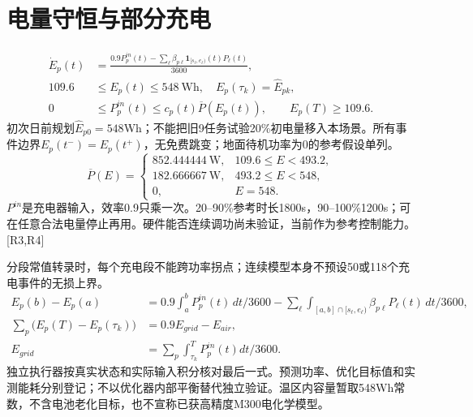 \section{电量守恒与部分充电}
\begin{align}
 \dot E_p(t)&=\frac{0.9P_p^{in}(t)-\sum_\ell\beta_{p\ell}
                   \mathbf1_{[s_\ell,e_\ell)}(t)P_\ell(t)}{3600},\\
 109.6&\le E_p(t)\le548\ \mathrm{Wh},\quad E_p(\tau_k)=\widehat E_{pk},\\
 0&\le P_p^{in}(t)\le c_p(t)\overline P(E_p(t)),\qquad E_p(T)\ge109.6.
 \label{eng:eq:battery}
\end{align}
\noindent 初次日前规划$\widehat E_{p0}=548$Wh；不能把旧9任务试验20\%初电量移入本场景。所有事件边界$E_p(t^-)=E_p(t^+)$，无免费跳变；地面待机功率为0的参考假设单列。
\begin{equation}
 \overline P(E)=\begin{cases}
 852.444444\ \mathrm W,&109.6\le E<493.2,\\
 182.666667\ \mathrm W,&493.2\le E<548,\\
 0,&E=548.
 \end{cases}
 \label{eng:eq:chargecurve}
\end{equation}
\noindent $P^{in}$是充电器输入，效率0.9只乘一次。20--90\%参考时长1800s，90--100\%1200s；可在任意合法电量停止再用。硬件能否连续调功尚未验证，当前作为参考控制能力。[R3,R4]

\noindent 分段常值转录时，每个充电段不能跨功率拐点；连续模型本身不预设50或118个充电事件的无损上界。
\begin{align}
 E_p(b)-E_p(a)&=0.9\int_a^bP_p^{in}(t)\,dt/3600
              -\sum_\ell\int_{[a,b]\cap[s_\ell,e_\ell)}\beta_{p\ell}P_\ell(t)\,dt/3600,\\
 \sum_p\big(E_p(T)-E_p(\tau_k)\big)&=0.9E_{grid}-E_{air},\label{eng:eq:energyledger}\\
 E_{grid}&=\sum_p\int_{\tau_k}^T P_p^{in}(t)dt/3600.
\end{align}
\noindent 独立执行器按真实状态和实际输入积分核对最后一式。预测功率、优化目标值和实测能耗分别登记；不以优化器内部平衡替代独立验证。温区内容量暂取548Wh常数，不含电池老化目标，也不宣称已获高精度M300电化学模型。
\clearpage


